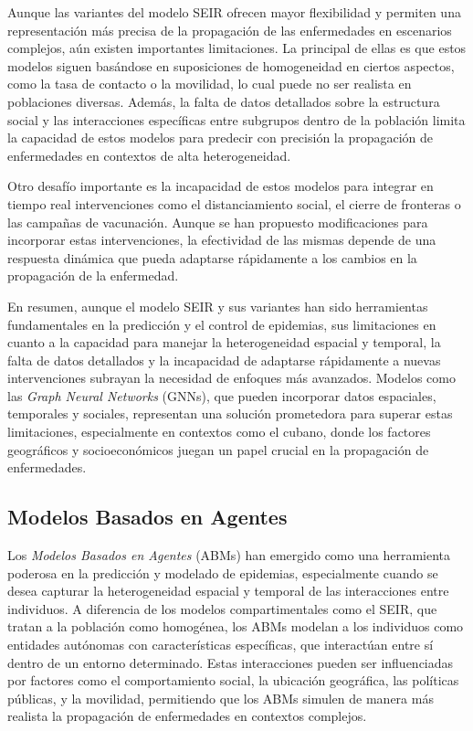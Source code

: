 Aunque las variantes del modelo SEIR ofrecen mayor flexibilidad y permiten una representación más precisa de la propagación de las enfermedades en escenarios complejos, aún existen importantes limitaciones. La principal de ellas es que estos modelos siguen basándose en suposiciones de homogeneidad en ciertos aspectos, como la tasa de contacto o la movilidad, lo cual puede no ser realista en poblaciones diversas. Además, la falta de datos detallados sobre la estructura social y las interacciones específicas entre subgrupos dentro de la población limita la capacidad de estos modelos para predecir con precisión la propagación de enfermedades en contextos de alta heterogeneidad.

Otro desafío importante es la incapacidad de estos modelos para integrar en tiempo real intervenciones como el distanciamiento social, el cierre de fronteras o las campañas de vacunación. Aunque se han propuesto modificaciones para incorporar estas intervenciones, la efectividad de las mismas depende de una respuesta dinámica que pueda adaptarse rápidamente a los cambios en la propagación de la enfermedad.

En resumen, aunque el modelo SEIR y sus variantes han sido herramientas fundamentales en la predicción y el control de epidemias, sus limitaciones en cuanto a la capacidad para manejar la heterogeneidad espacial y temporal, la falta de datos detallados y la incapacidad de adaptarse rápidamente a nuevas intervenciones subrayan la necesidad de enfoques más avanzados. Modelos como las \textit{Graph Neural Networks} (GNNs), que pueden incorporar datos espaciales, temporales y sociales, representan una solución prometedora para superar estas limitaciones, especialmente en contextos como el cubano, donde los factores geográficos y socioeconómicos juegan un papel crucial en la propagación de enfermedades.

\subsection{Modelos Basados en Agentes}\label{section:agent-based-models}

Los \textit{Modelos Basados en Agentes} (ABMs) han emergido como una herramienta poderosa en la predicción y modelado de epidemias, especialmente cuando se desea capturar la heterogeneidad espacial y temporal de las interacciones entre individuos. A diferencia de los modelos compartimentales como el SEIR, que tratan a la población como homogénea, los ABMs modelan a los individuos como entidades autónomas con características específicas, que interactúan entre sí dentro de un entorno determinado. Estas interacciones pueden ser influenciadas por factores como el comportamiento social, la ubicación geográfica, las políticas públicas, y la movilidad, permitiendo que los ABMs simulen de manera más realista la propagación de enfermedades en contextos complejos.

